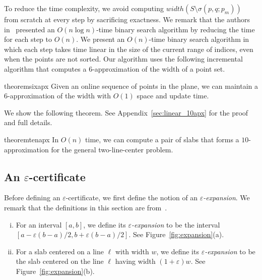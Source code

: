 \documentclass[english,a4paper, cleveref, autoref, thm-restate, nolineno]{socg-lipics-v2021}
\theoremstyle{star}
\theoremstyle{claimstar}
\newcommand{\eps}{\ensuremath{\varepsilon}}
\begin{document}
To reduce the time complexity, we avoid computing ${width}(S \setminus \sigma(p, q; p_m))$ from scratch at every step by sacrificing exactness.  
We remark that the authors in~\cite{agarwalTwo} presented an $O(n \log n)$-time 
binary search algorithm by reducing the time for each step to $O(n)$. 
We present an $O(n)$-time binary search algorithm in which each step 
takes time linear in the size of the current range of indices, even when the points are not sorted.
Our algorithm uses the following incremental algorithm that computes a $6$-approximation of the width of a point set.


\begin{restatable}{theorem}{sixapx}
    \label{thm:6apx}
    Given an online sequence of points in the plane, we can maintain a $6$-approximation of the width with $O(1)$ space and update time.
\end{restatable}



We show the following theorem. See Appendix~\ref{sec:linear_10apx} for the proof and full details.

\begin{restatable}{theorem}{tenapx}
    \label{thm:10apx}
    In $O(n)$ time, we can compute a pair of slabs that forms a $10$-approximation for the general two-line-center problem.
\end{restatable}

\subsection{An \texorpdfstring{$\eps$}{epsilon}-certificate}
\label{sec:eps_certificate}


Before defining an $\eps$-certificate, we first define the notion of an \emph{$\eps$-expansion}.
We remark that the definitions in this section are from~\cite{agarwal2005approximation}.

\begin{definition}[$\eps$-expansion]
\begin{enumerate}[(i)]
    \item For an interval $[a, b]$, 
    we define its \emph{$\eps$-expansion} to be the interval $[a- \eps(b-a)/2, b + \eps(b-a)/2]$. See Figure~\ref{fig:expansion}(a).
    \item For a slab centered on a line $\ell$ with width $w$,
    we define its \emph{$\eps$-expansion} to be the slab centered on the line $\ell$ having width  $(1+ \eps) w$.
    See Figure~\ref{fig:expansion}(b).
\end{enumerate}
\end{definition}
\end{document}
